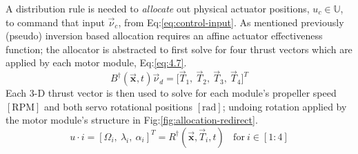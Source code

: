 \par
A distribution rule is needed to \emph{allocate} out physical actuator positions, $u_c\in\mathbb{U}$, to command that input $\vec{\nu}_c$, from Eq:\ref{eq:control-input}. As mentioned previously (pseudo) inversion based allocation requires an affine actuator effectiveness function; the allocator is abstracted to first solve for four thrust vectors which are applied by each motor module, Eq:\ref{eq:4.7}.
\begin{equation}\label{eq:5.1}
B^{\dagger}(\vec{\mathbf{x}},t)\vec{\nu}_d=\big[\vec{T}_1,~\vec{T}_2,~\vec{T}_3,~\vec{T}_4\big]^T
\end{equation}
Each 3-D thrust vector is then used to solve for each module's propeller speed $[\text{RPM}]$ and both servo rotational positions $[\text{rad}]$; undoing rotation applied by the motor module's structure in Fig:\ref{fig:allocation-redirect}.
\begin{equation}
u\cdot i = [\Omega_i,~\lambda_i,~\alpha_i]^T=R^\dagger(\vec{\mathbf{x}},\vec{T}_i,t)~~~~\text{for}~i\in[1:4]
\end{equation}

